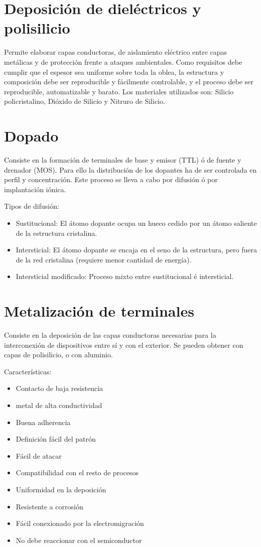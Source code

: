 \section{Deposición de dieléctricos y polisilicio}

Permite elaborar capas conductoras, de aislamiento eléctrico entre capas metálicas y de protección frente a ataques ambientales. Como requisitos debe cumplir que el espesor sea uniforme sobre toda la oblea, la estructura y composición debe ser reproducible y fácilmente controlable, y el proceso debe ser reproducible, automatizable y barato. Los materiales utilizados son: Silicio policristalino, Dióxido de Silicio y Nitruro de Silicio.

\section{Dopado}

Consiste en la formación de terminales de base y emisor (TTL) ó de fuente y drenador (MOS). Para ello la distribución de los dopantes ha de ser controlada en perfil y concentración. Este proceso se lleva a cabo por difusión ó por implantación iónica.

Tipos de difusión:
\begin{itemize}
    \item Sustitucional: El átomo dopante ocupa un hueco cedido por un átomo saliente de la estructura cristalina.
    \item Intersticial: El átomo dopante se encaja en el seno de la estructura, pero fuera de la red cristalina (requiere menor cantidad de energía).
    \item Intersticial modificado: Proceso mixto entre sustitucional é intersticial.
\end{itemize}

\section{Metalización de terminales}

Consiste en la deposición de las capas conductoras necesarias para la interconexión de dispositivos entre sí y con el exterior. Se pueden obtener con capas de polisilicio, o con aluminio.

Características:
\begin{itemize}
    \item Contacto de baja resistencia
    \item metal de alta conductividad
    \item Buena adherencia
    \item Definición fácil del patrón
    \item Fácil de atacar
    \item Compatibilidad con el resto de procesos
    \item Uniformidad en la deposición
    \item Resistente a corrosión
    \item Fácil conexionado por la electromigración
    \item No debe reaccionar con el semiconductor
\end{itemize}